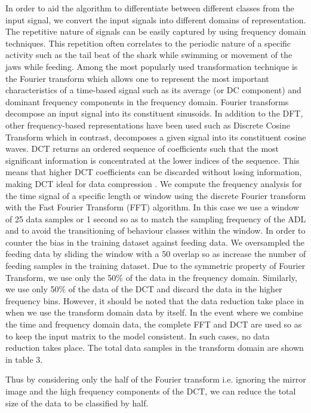 \documentclass[conference]{IEEEtran}
\begin{document}
In order to aid the algorithm to differentiate between different classes from the input signal, we convert the input signals into different domains of representation. The repetitive nature of signals can be easily captured by using frequency domain techniques. This repetition often correlates to the periodic nature of a specific activity such as the tail beat of the shark while swimming or movement of the jaws while feeding. Among the most popularly used transformation technique is the Fourier transform which allows one to represent the most important characteristics of a time-based signal such as its average (or DC component) and dominant frequency components in the frequency domain. Fourier transforms decompose an input signal into its constituent sinusoids.  In addition to the DFT, other frequency-based representations have been used such as Discrete Cosine Transform which in contrast, decomposes a given signal into its constituent cosine waves. DCT returns an ordered sequence of coefficients such that the most significant information is concentrated at the lower indices of the sequence.  This means that higher DCT coefficients can be discarded without losing information, making DCT ideal for data compression \cite{15}.
We compute the frequency analysis for the time signal of a specific length or window using the discrete Fourier transform with the Fast Fourier Transform (FFT) algorithm. In this case we use a window of 25 data samples or 1 second so as to match the sampling frequency of the ADL and to avoid the transitioning of behaviour classes within the window. In order to counter the bias in the training dataset against feeding data. We oversampled the feeding data by sliding the window with a 50 overlap \cite{16} so as increase the number of feeding samples in the training dataset. Due to the symmetric property of Fourier Transform, we use only the 50\% of the data in the frequency domain. Similarly, we use only 50\% of the data of the DCT and discard the data in the higher frequency bins. However, it should be noted that the data reduction take place in when we use the transform domain data by itself. In the event where we combine the time and frequency domain data, the complete FFT and DCT are used so as to keep the input matrix to the model consistent. In such cases, no data reduction takes place. The total data samples in the transform domain are shown in table 3.


Thus by considering only the half of the Fourier transform i.e. ignoring the mirror image and the high frequency components of the DCT, we can reduce the total size of the data to be classified by half.
\end{document}
